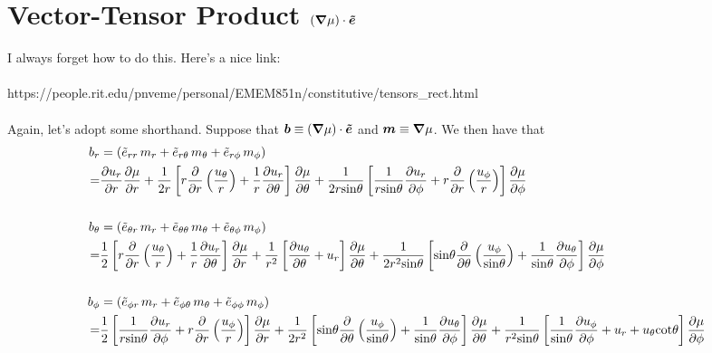 \documentclass[10pt, letterpaper]{article}
\begin{document}
\section{Vector-Tensor Product $\left(\boldsymbol{\nabla}\mu\right)\cdot\boldsymbol{\tilde{e}}$}
I always forget how to do this.  Here's a nice link:  
\\
\\
https://people.rit.edu/pnveme/personal/EMEM851n/constitutive/tensors\_rect.html
\\
\\
Again, let's adopt some shorthand.  Suppose that $\boldsymbol{b}\equiv\left(\boldsymbol{\nabla}\mu\right)\cdot\boldsymbol{\tilde{e}}$ and $\boldsymbol{m}\equiv\boldsymbol{\nabla}\mu$.  We then have that
\begin{align}
\label{eq:vectens}
b_r &=  \left(\tilde{e}_{rr}\,m_r + \tilde{e}_{r\theta}\,m_\theta + \tilde{e}_{r\phi}\,m_\phi \right) \\ =&  \frac{\partial u_r}{\partial r} \frac{\partial \mu}{\partial r} + \frac{1}{2 r} \left[r \frac{\partial}{\partial r} \left( \frac{u_{\theta}}{r}\right) + \frac{1}{r} \frac{\partial u_r}{\partial \theta} \right] \frac{\partial \mu}{\partial \theta} + \frac{1}{2 r \mathrm{sin}\theta} \left[\frac{1}{r \mathrm{sin}\theta} \frac{\partial u_r}{\partial \phi} + r \frac{\partial}{\partial r} \left(\frac{u_{\phi}}{r} \right) \right] \frac{\partial \mu}{\partial \phi}  \\ \\
b_\theta &=\left(\tilde{e}_{\theta r}\,m_r + \tilde{e}_{\theta\theta}\,m_\theta + \tilde{e}_{\theta\phi}\,m_\phi \right) \\=& \frac{1}{2} \left[r \frac{\partial}{\partial r} \left(\frac{u_{\theta}}{r} \right) + \frac{1}{r} \frac{\partial u_r}{\partial \theta} \right] \frac{\partial \mu}{\partial r} + \frac{1}{r^2} \left[\frac{\partial u_{\theta}}{\partial \theta} + u_r \right] \frac{\partial \mu}{\partial \theta} + \frac{1}{2 r^2 \mathrm{sin}\theta} \left[\mathrm{sin}\theta \frac{\partial}{\partial \theta} \left(\frac{u_{\phi}}{\mathrm{sin}\theta} \right) + \frac{1}{\mathrm{sin}\theta} \frac{\partial u_{\theta}}{\partial \phi} \right] \frac{\partial \mu}{\partial \phi}\\ \\ 
b_\phi &=  \left(\tilde{e}_{\phi r}\,m_r + \tilde{e}_{\phi\theta}\,m_\theta + \tilde{e}_{\phi\phi}\,m_\phi \right) \\ =& \frac{1}{2} \left[\frac{1}{r \mathrm{sin}\theta} \frac{\partial u_r}{\partial \phi} + r \frac{\partial}{\partial r} \left(\frac{u_{\phi}}{r} \right) \right] \frac{\partial \mu}{\partial r} + \frac{1}{2 r^2} \left[\mathrm{sin}\theta \frac{\partial}{\partial \theta} \left(\frac{u_{\phi}}{\mathrm{sin}\theta} \right) + \frac{1}{\mathrm{sin}\theta} \frac{\partial u_{\theta}}{\partial \phi} \right] \frac{\partial \mu}{\partial \theta} + \frac{1}{r^2 \mathrm{sin}\theta} \left[\frac{1}{\mathrm{sin}\theta} \frac{\partial u_{\phi}}{\partial \phi} + u_r + u_{\theta} \mathrm{cot}\theta \right] \frac{\partial \mu}{\partial \phi} 
\end{align}
\end{document}
